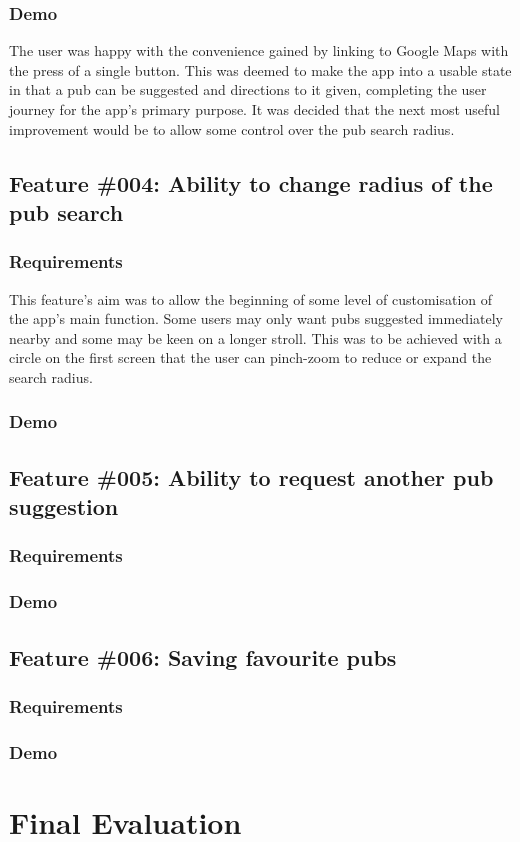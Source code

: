 \documentclass{report}
\begin{document}
\subsection{Demo}

The user was happy with the convenience gained by linking to Google Maps
with the press of a single button. This was deemed to make the app into
a usable state in that a pub can be suggested and directions to it given,
completing the user journey for the app's primary purpose. It was decided
that the next most useful improvement would be to allow some control over
the pub search radius.

\section{Feature \#004: Ability to change radius of the pub search}
\subsection{Requirements}

This feature's aim was to allow the beginning of some level of customisation
of the app's main function. Some users may only want pubs suggested
immediately nearby and some may be keen on a longer stroll. This was to be
achieved with a circle on the first screen that the user can pinch-zoom
to reduce or expand the search radius.

\subsection{Demo}

\section{Feature \#005: Ability to request another pub suggestion}
\subsection{Requirements}
\subsection{Demo}

\section{Feature \#006: Saving favourite pubs}
\subsection{Requirements}
\subsection{Demo}

\chapter{Final Evaluation}
\label{chapter:evaluation}
\end{document}

